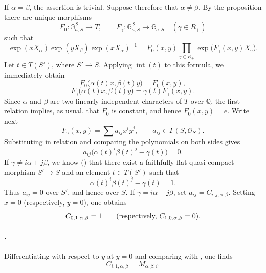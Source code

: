 If \(\alpha=\beta\), the assertion is trivial. Suppose therefore
that \(\alpha\ne\beta\). By the proposition there are unique
morphisms
\[
  F_0:\mathbb G_{a,S}^{\,2}\longrightarrow T,
  \qquad
  F_\gamma:\mathbb G_{a,S}^{\,2}\longrightarrow\mathbb G_{a,S}
  \quad(\gamma\in R_+)
\]
such that
\[
  \exp(xX_\alpha)\exp(yX_\beta)\exp(xX_\alpha)^{-1}
  =
  F_0(x,y)
  \prod_{\gamma\in R_+}
    \exp\bigl(F_\gamma(x,y)X_\gamma\bigr).
\]
Let \(t\in T(S')\), where \(S'\to S\). Applying
\(\operatorname{int}(t)\) to this formula, we immediately obtain
\[
  \tag{1}\label{sga3:xxii:subsection:5-5:equation:1}
  F_0\bigl(\alpha(t)x,\beta(t)y\bigr)=F_0(x,y),
\]
\[
  \tag{2}\label{sga3:xxii:subsection:5-5:equation:2}
  F_\gamma\bigl(\alpha(t)x,\beta(t)y\bigr)
  =
  \gamma(t)F_\gamma(x,y).
\]
Since \(\alpha\) and \(\beta\) are two linearly independent
characters of \(T\) over \(\mathbb Q\), the first relation implies,
as usual, that \(F_0\) is constant, and hence
\(F_0(x,y)=e\). Write next
\[
  F_\gamma(x,y)=\sum a_{ij}x^iy^j,
  \qquad a_{ij}\in\Gamma(S,\mathcal O_S).
\]
Substituting in relation \textup{} and comparing the
polynomials on both sides gives
\[
  a_{ij}
  \bigl(\alpha(t)^i\beta(t)^j-\gamma(t)\bigr)=0.
\]
If \(\gamma\ne i\alpha+j\beta\), we know
\textup{()} that there exist a faithfully flat
quasi-compact morphism \(S'\to S\) and an element \(t\in T(S')\)
such that
\[
  \alpha(t)^i\beta(t)^j-\gamma(t)=1.
\]
Thus \(a_{ij}=0\) over \(S'\), and hence over \(S\). If
\(\gamma=i\alpha+j\beta\), set
\(a_{ij}=C_{i,j,\alpha,\beta}\). Setting \(x=0\)
\textup{(respectively, \(y=0\))}, one obtains
\[
  C_{0,1,\alpha,\beta}=1
  \qquad
  \textup{(respectively, \(C_{1,0,\alpha,\beta}=0\)).}
\]

\paragraph{.}
Differentiating with respect to \(y\) at \(y=0\) and comparing
with , one finds
\[
  C_{i,1,\alpha,\beta}=M_{\alpha,\beta,i}.
\]

